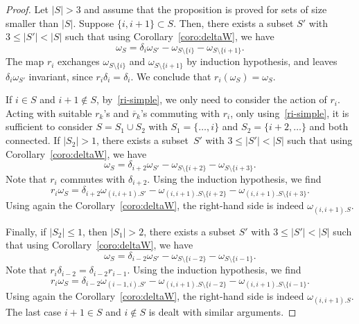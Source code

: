 \documentclass[10pt,a4paper]{amsart}
\numberwithin{equation}{section}
\theoremstyle{definition}
\newcommand{\rb}{\overline{r}}
\begin{document}
\begin{proof}
Let $|S|>3$ and assume that the proposition is proved for sets of size smaller than $|S|$. Suppose $\{i,i+1\}\subset S$. Then, there exists a subset $S'$ with $3\leq |S'|<|S|$ such that using Corollary~\ref{coro:deltaW}, we have
\begin{equation*}
\omega_{S} = \delta_i\omega_{S'}-\omega_{S\setminus\{i\}}-\omega_{S\setminus\{i+1\}}.
\end{equation*}
The map $r_i$ exchanges $\omega_{S\setminus\{i\}}$ and $\omega_{S\setminus\{i+1\}}$
by induction hypothesis, and leaves $ \delta_i\omega_{S'}$ invariant, since $r_i\delta_i=\delta_i$.
We conclude that $r_i(\omega_{S}) =\omega_{S}$.

If $i\in S$ and $i+1\not\in S$, by~\eqref{ri-simple}, we only need to consider the action of $r_i$. Acting with suitable $r_k$'s and $\rb_k$'s commuting with $r_i$, only using~\eqref{ri-simple}, it is sufficient to consider
$S=S_1\cup S_2$ with $S_1=\{\dots,i\}$ and $S_2=\{i+2,\dots\}$ and both connected.
If $|S_2|>1$, there exists a subset~$S'$ with $3\leq |S'|<|S|$ such that using Corollary~\ref{coro:deltaW}, we have
\begin{equation*}
\omega_{S} = \delta_{i+2}\omega_{S'}-\omega_{S\setminus\{i+2\}}-\omega_{S\setminus\{i+3\}}.
\end{equation*}
Note that $r_i$ commutes with $\delta_{i+2}$. Using the induction hypothesis, we find
\begin{equation*}
r_i\omega_{S} = \delta_{i+2}\omega_{(i,i+1).S'}-\omega_{(i,i+1).S\setminus\{i+2\}}-\omega_{(i,i+1).S\setminus\{i+3\}}.
\end{equation*}
Using again the Corollary~\ref{coro:deltaW}, the right-hand side is indeed $\omega_{(i,i+1).S}$.

Finally, if $|S_2|\leq1$, then $|S_1|>2$, there exists a subset $S'$ with $3\leq |S'|<|S|$ such that using Corollary~\ref{coro:deltaW}, we have
\begin{equation*}
\omega_{S} = \delta_{i-2}\omega_{S'}-\omega_{S\setminus\{i-2\}}-\omega_{S\setminus\{i-1\}}.
\end{equation*}
Note that $r_i\delta_{i-2}=\delta_{i-2}r_{i-1}$. Using the induction hypothesis, we find
\begin{equation*}
r_i\omega_{S} = \delta_{i-2}\omega_{(i-1,i).S'}-\omega_{(i,i+1).S\setminus\{i-2\}}-\omega_{(i,i+1).S\setminus\{i-1\}}.
\end{equation*}
Using again the Corollary~\ref{coro:deltaW}, the right-hand side is indeed $\omega_{(i,i+1).S}$. The last case $i+1\in S$ and $i\not\in S$ is dealt with similar arguments.
\end{proof}
\end{document}
